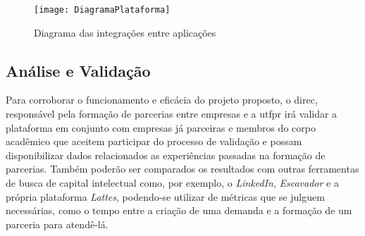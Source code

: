\begin{figure}[htb]
    \caption{Diagrama das integrações entre aplicações}
    \texttt{[image: DiagramaPlataforma]}
    \label{fig:diagrama}
\end{figure}

\subsection{Análise e Validação}\label{subsec:validacao}

Para corroborar o funcionamento e eficácia do projeto proposto, o \gls{direc}, responsável pela formação de parcerias entre empresas e a \gls{utfpr} irá validar a plataforma em conjunto com empresas já parceiras e membros do corpo acadêmico que aceitem participar do processo de validação e possam disponibilizar dados relacionados as experiências passadas na formação de parcerias. Também poderão ser comparados os resultados com outras ferramentas de busca de capital intelectual como, por exemplo, o \textit{LinkedIn}, \textit{Escavador} e a própria plataforma \textit{Lattes}, podendo-se utilizar de métricas que se julguem necessárias, como o tempo entre a criação de uma demanda e a formação de um parceria para atendê-lá.